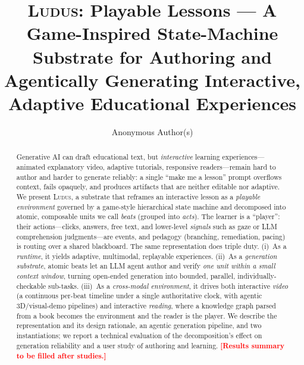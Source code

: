 \documentclass[sigconf,review,anonymous]{acmart}
\newcommand{\PH}[1]{\textcolor{red}{\textbf{[#1]}}}
\newcommand{\sys}{\textsc{Ludus}\xspace}
\begin{document}
\title{\sys: Playable Lessons — A Game-Inspired State-Machine Substrate for
Authoring and Agentically Generating Interactive, Adaptive Educational Experiences}

\author{Anonymous Author(s)}

\begin{abstract}
Generative AI can draft educational text, but \emph{interactive} learning
experiences---animated explanatory video, adaptive tutorials, responsive
readers---remain hard to author and harder to generate reliably: a single
``make me a lesson'' prompt overflows context, fails opaquely, and produces
artifacts that are neither editable nor adaptive. We present \sys, a substrate
that reframes an interactive lesson as a \emph{playable environment} governed by
a game-style hierarchical state machine and decomposed into atomic, composable
units we call \emph{beats} (grouped into \emph{acts}). The learner is a
``player'': their actions---clicks, answers, free text, and lower-level
\emph{signals} such as gaze or LLM comprehension judgments---are events, and
pedagogy (branching, remediation, pacing) is routing over a shared blackboard.
The same representation does triple duty. (i)~As a \emph{runtime}, it yields
adaptive, multimodal, replayable experiences. (ii)~As a \emph{generation
substrate}, atomic beats let an LLM agent author and verify \emph{one unit
within a small context window}, turning open-ended generation into bounded,
parallel, individually-checkable sub-tasks. (iii)~As a \emph{cross-modal
environment}, it drives both interactive \emph{video} (a continuous per-beat
timeline under a single authoritative clock, with agentic 3D/visual-demo
pipelines) and interactive \emph{reading}, where a knowledge graph parsed from a
book becomes the environment and the reader is the player. We describe the
representation and its design rationale, an agentic generation pipeline, and two
instantiations; we report a technical evaluation of the
decomposition's effect on generation reliability and a user study of authoring
and learning. \PH{Results summary to be filled after studies.}
\end{abstract}


\maketitle
\end{document}

